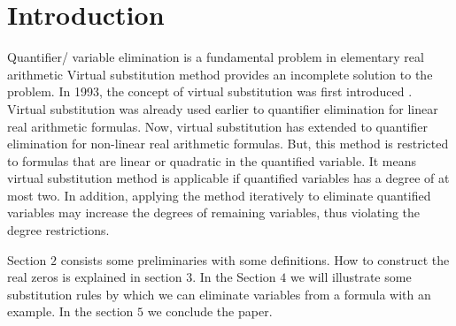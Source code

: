 \section{Introduction}
\label{sec:introduction}
Quantifier/ variable elimination is a fundamental problem in elementary real arithmetic Virtual substitution method provides an incomplete solution to the problem. In 1993, the concept of virtual substitution was first introduced \cite{weispfenning}. Virtual substitution was already used earlier to quantifier elimination for linear real arithmetic formulas. Now, virtual substitution has extended to quantifier elimination for non-linear real arithmetic formulas. But, this method is restricted
to formulas that are linear or quadratic in the quantified variable. It means virtual substitution method is applicable if quantified variables has a degree of at most two. In addition, applying the method iteratively to eliminate quantified variables may increase the degrees of remaining variables, thus violating the degree restrictions.

Section $2$ consists some preliminaries with some definitions. How to construct the real zeros is explained in section $3$. In the Section $4$ we will illustrate some substitution rules by which we can eliminate variables from a formula with an example. In the section $5$ we conclude the paper.
